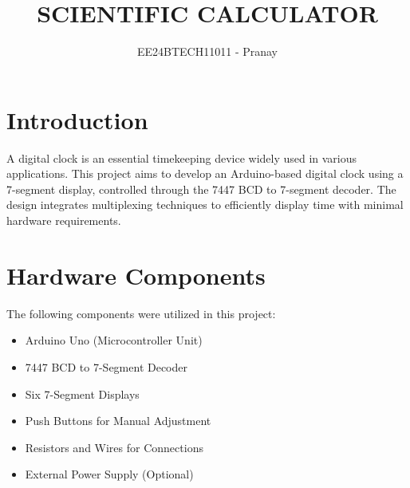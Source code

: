 \documentclass[journal]{IEEEtran}
\begin{document}

\vspace{3cm}

\title{SCIENTIFIC CALCULATOR}
\author{EE24BTECH11011 - Pranay}

{\let\newpage\relax\maketitle}

\renewcommand{\thefigure}{\theenumi}
\renewcommand{\thetable}{\theenumi}
\setlength{\intextsep}{10pt} %


\renewcommand{\thetable}{\theenumi}

\section{Introduction}
A digital clock is an essential timekeeping device widely used in various applications. This project aims to develop an Arduino-based digital clock using a 7-segment display, controlled through the 7447 BCD to 7-segment decoder. The design integrates multiplexing techniques to efficiently display time with minimal hardware requirements.

\section{Hardware Components}
The following components were utilized in this project:
\begin{itemize}
    \item Arduino Uno (Microcontroller Unit)
    \item 7447 BCD to 7-Segment Decoder
    \item Six 7-Segment Displays
    \item Push Buttons for Manual Adjustment
    \item Resistors and Wires for Connections
    \item External Power Supply (Optional)
\end{itemize}
\end{document}
